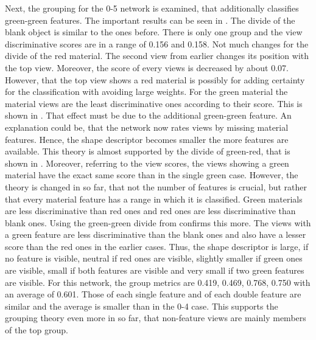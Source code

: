 Next, the grouping for the 0-5 network is examined, that additionally classifies green-green features.
The important results can be seen in .
The divide of the blank object is similar to the ones before.
There is only one group and the view discriminative scores are in a range of 0.156 and 0.158.
Not much changes for the divide of the red material.
The second view from earlier changes its position with the top view.
Moreover, the score of every views is decreased by about 0.07.
However, that the top view shows a red material is possibly for adding certainty for the classification with avoiding large weights.
For the green material the material views are the least discriminative ones according to their score.
This is shown in .
That effect must be due to the additional green-green feature.
An explanation could be, that the network now rates views by missing material features.
Hence, the shape descriptor becomes smaller the more features are available.
This theory is almost supported by the divide of green-red, that is shown in .
Moreover, referring to the view scores, the views showing a green material have the exact same score than in the single green case.
However, the theory is changed in so far, that not the number of features is crucial, but rather that every material feature has a range in which it is classified.
Green materials are less discriminative than red ones and red ones are less discriminative than blank ones.
Using the green-green divide from  confirms this more.
The views with a green feature are less discriminative than the blank ones and also have a lesser score than the red ones in the earlier cases.
Thus, the shape descriptor is large, if no feature is visible, neutral if red ones are visible, slightly smaller if green ones are visible, small if both features are visible and very small if two green features are visible.
For this network, the group metrics are 0.419, 0.469, 0.768, 0.750 with an average of 0.601.
Those of each single feature and of each double feature are similar and the average is smaller than in the 0-4 case.
This supports the grouping theory even more in so far, that non-feature views are mainly members of the top group.
